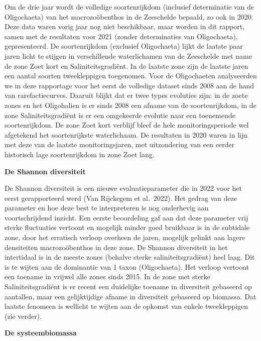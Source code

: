 \documentclass[twoside]{extreport}
\begin{document}
Om de drie jaar wordt de volledige soortenrijkdom (inclusief
determinatie van de Oligochaeta) van het macrozoöbenthos in de
Zeeschelde bepaald, zo ook in 2020. Deze data waren vorig jaar nog niet
beschikbaar, maar worden in dit rapport, samen met de resultaten voor
2021 (zonder determinaties van Oligochaeta), gepresenteerd. De
soortenrijkdom (exclusief Oligochaeta) lijkt de laatste paar jaren licht
te stijgen in verschillende waterlichamen van de Zeeschelde met name de
zone Zoet kort en Saliniteitsgradiënt. In de laatste zone zijn de
laatste jaren een aantal soorten tweekleppigen toegenomen. Voor de
Oligochaeten analyseerden we in deze rapportage voor het eerst de
volledige dataset sinds 2008 aan de hand van rarefactiecurves. Daaruit
blijkt dat er twee types evoluties zijn: in de zoete zones en het
Oligohalien is er sinds 2008 een afname van de soortenrijkdom, in de
zone Saliniteitsgradiënt is er een omgekeerde evolutie naar een
toenemende soortenrijkdom. De zone Zoet kort verblijf bleef de hele
monitoringsperiode wel afgetekend het soortenrijkste waterlichaam. De
resultaten in 2020 waren in lijn met deze van de laatste
monitoringsjaren, met uitzondering van een eerder historisch lage
soortenrijkdom in zone Zoet lang.

\textbf{De Shannon diversiteit}

De Shannon diversiteit is een nieuwe evaluatieparameter die in 2022 voor
het eerst gerapporteerd werd (Van Rijckegem et al.~2022). Het gedrag van
deze parameter en hoe deze best te interpreteren is nog onderhevig aan
voortschrijdend inzicht. Een eerste beoordeling gaf aan dat deze
parameter vrij sterke fluctuaties vertoont en mogelijk minder goed
bruikbaar is in de subtidale zone, door het erratisch verloop overheen
de jaren, mogelijk gelinkt aan lagere densiteiten macrozoöbenthos in
deze zone. De Shannon diversiteit in het intertidaal is in de meeste
zones (behalve sterke saliniteitsgradiënt) heel laag. Dit is te wijten
aan de dominantie van 1 taxon (Oligochaeta). Het verloop vertoont een
toename in vrijwel alle zones sinds 2015. In de zone met sterke
Saliniteitsgradiënt is er recent een duidelijke toename in diversiteit
gebaseerd op aantallen, maar een gelijktijdige afname in diversiteit
gebaseerd op biomassa. Dat laatste fenomeen is wellicht te wijten aan de
opkomst van enkele tweekleppigen (zie verder).

\textbf{De systeembiomassa}
\end{document}
